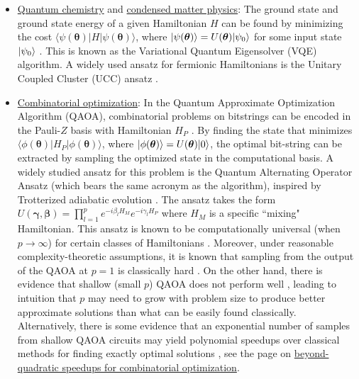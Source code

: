 \begin{refsection}
\begin{itemize}
    \item \hyperref[appl:QuantumChemistry]{Quantum chemistry} and \hyperref[appl:CondensedMatter]{condensed matter physics}: The ground state and ground state energy of a given Hamiltonian $H$ can be found by minimizing the cost $\langle\psi(\boldsymbol{\theta})|H| \psi(\boldsymbol{\theta})\rangle$, where $\lvert\psi(\boldsymbol{\theta})\rangle=U(\boldsymbol{\theta})\lvert\psi_0\rangle$ for some input state $\lvert\psi_0\rangle$ \cite{peruzzo2014VQE}. This is known as the Variational Quantum Eigensolver (VQE) algorithm. A widely used ansatz for fermionic Hamiltonians is the Unitary Coupled Cluster (UCC) ansatz \cite{taube2006new, peruzzo2014VQE, bravyi2002fermionic, lee2018generalizedUCC, motta2021lowrankrep, matsuzawa2020jastrow, kivlichan2018quantum, seita2019SuperfastEncodings}.
    \item \hyperref[appl:CombOpt]{Combinatorial optimization}: In the Quantum Approximate Optimization Algorithm (QAOA), combinatorial problems on bitstrings can be encoded in the Pauli-$Z$ basis with Hamiltonian $H_P$ \cite{farhi2014QAOA}. By finding the state that minimizes $\langle\phi(\boldsymbol{\theta})|H_P| \phi(\boldsymbol{\theta})\rangle$, where $\lvert\phi(\boldsymbol{\theta})\rangle = U(\boldsymbol{\theta})\lvert0\rangle$, the optimal bit-string can be extracted by sampling the optimized state in the computational basis. A widely studied ansatz for this problem is the Quantum Alternating Operator Ansatz (which bears the same acronym as the algorithm), inspired by Trotterized adiabatic evolution \cite{hadfield2019qaoa}. The ansatz takes the form $U(\boldsymbol{\gamma}, \boldsymbol{\beta})=\prod_{l=1}^{p} e^{-i \beta_{l} H_{M}} e^{-i \gamma_{l} H_{P}}$ where $H_M$ is a specific ``mixing" Hamiltonian. This ansatz is known to be computationally universal (when $p\rightarrow \infty$) for certain classes of Hamiltonians \cite{lloyd2018quantum, morales2020universality}. Moreover, under reasonable complexity-theoretic assumptions, it is known that sampling from the output of the QAOA at $p=1$ is classically hard \cite{farhi2016quantumsuprem}. On the other hand, there is evidence that shallow (small $p$) QAOA does not perform well \cite{bravyi2020obstaclesvariational, hastings2019BoundedDepthAlgorithms, farhi2020QAOAneeds1, farhi2020QAOAneeds2}, leading to intuition that $p$ may need to grow with problem size to produce better approximate solutions than what can be easily found classically. Alternatively, there is some evidence that an exponential number of samples from shallow QAOA circuits may yield polynomial speedups over classical methods for finding exactly optimal solutions \cite{boulebnane2022solvingSATwQAOA,shaydulin2023evidenceQAOA}, see the page on \hyperref[appl:BeyondGrover]{beyond-quadratic speedups for combinatorial optimization}. 

\end{itemize}
\end{refsection}
